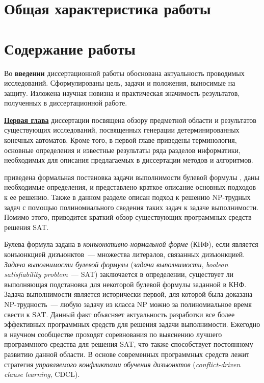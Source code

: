 
\section*{Общая характеристика работы} %



\section*{Содержание работы}

Во \textbf{введении} диссертационной работы обоснована актуальность проводимых исследований. Сформулированы цель, задачи и положения, выносимые на защиту. Изложена научная новизна и практическая значимость результатов, полученных в диссертационной работе.


\textbf{\underline{Первая глава}} диссертации посвящена обзору предметной области и результатов существующих исследований, посвященных генерации детерминированных конечных автоматов.
Кроме того, в первой главе приведены терминология, основные определения и известные результаты ряда разделов информатики, необходимых для описания предлагаемых в диссертации методов и алгоритмов.

\insection{\ref{sec:review:sat}} приведена формальная постановка задачи выполнимости булевой формулы , даны необходимые определения, и представлено краткое описание основных подходов к ее решению.
Также в данном разделе описан подход к решению NP-трудных задач с помощью полиномиального сведения таких задач к задаче выполнимости.
Помимо этого, приводится краткий обзор существующих программных средств решения SAT.

Булева формула задана в \emph{конъюнктивно-нормальной форме} (КНФ), если является конъюнкцией дизъюнктов~--- множества литералов, связанных дизъюнкцией.
\emph{Задача выполнимости булевой формулы} (\emph{задача выполнимости}, \emph{boolean satisfiability problem}~{---} SAT) заключается в определении, существует ли выполняющая подстановка для некоторой булевой формулы заданной в КНФ.
Задача выполнимости является исторически первой, для которой была доказана NP-трудность~--- любую задачу из класса NP можно за полиномиальное время свести к SAT.
Данный факт объясняет актуальность разработки все более эффективных программных средств для решения задачи выполнимости.
Ежегодно в научном сообществе проходят соревнования по выяснению лучшего программного средства для решения SAT, что также способствует постоянному развитию данной области.
В основе современных программных средств лежит стратегия \emph{управляемого конфликтами обучения дизъюнктов} (\emph{conflict-driven clause learning}, CDCL).

